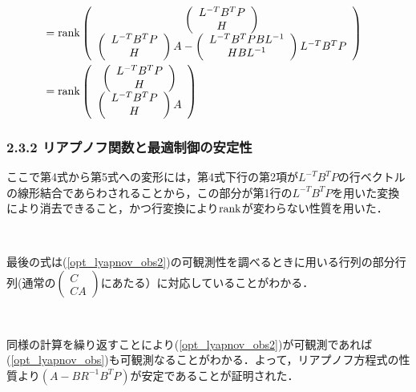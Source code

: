 \begin{frame}[t]
{\begin{align}
\nonumber \\
	&=
	\mathop{\rm rank}\nolimits \left(\begin{array}{c} \left(\begin{array}{c} L^{-T} B^T P \\ H \end{array}\right) \\
                            \left(\begin{array}{c} L^{-T} B^T P \\ H \end{array}\right) A
                          - \left(\begin{array}{c} L^{-T} B^T P B L^{-1}\\ H B L^{-1}\end{array}\right)  L^{-T} B^T P
               \end{array}\right)
\nonumber \\
	&=
	\mathop{\rm rank}\nolimits \left(\begin{array}{c} \left(\begin{array}{c} L^{-T} B^T P \\ 
                                      H 
                          \end{array}\right) \\
                          \left(\begin{array}{c} L^{-T} B^T P \\ 
                                      H
                          \end{array}\right) A
                    \end{array}\right)
\end{align}
}
\end{frame}

\begin{frame}[t]
\frametitle{2.3.2 リアプノフ関数と最適制御の安定性}

ここで第4式から第5式への変形には，第4式下行の第2項が$L^{-T} B^T P$の行ベクトルの線形結合であらわされることから，この部分が第1行の$L^{-T} B^T P$を用いた変換により消去できること，かつ行変換により$\mathop{\rm rank}\nolimits$が変わらない性質を用いた．

\ 

最後の式は(\ref{opt_lyapnov_obs2})の可観測性を調べるときに用いる行列の部分行列(通常の$\left(\begin{array}{c} C \\CA \end{array}\right)$にあたる）に対応していることがわかる．

\ 

同様の計算を繰り返すことにより(\ref{opt_lyapnov_obs2})が可観測であれば(\ref{opt_lyapnov_obs})も可観測なることがわかる．よって，リアプノフ方程式の性質より$(A - B R^{-1} B^T P)$が安定であることが証明された．　

\end{frame}

